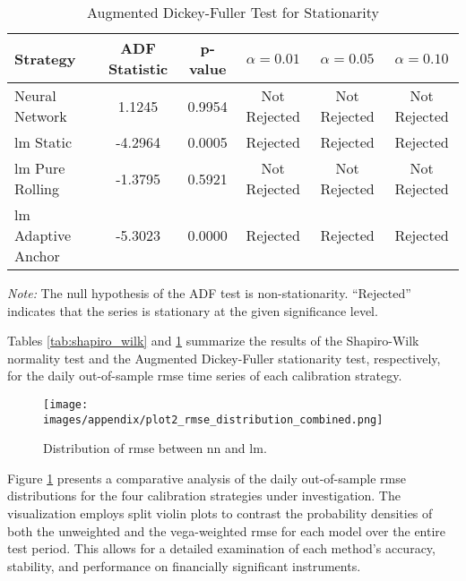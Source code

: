 \begin{table}[H]
	\centering
	\begin{threeparttable}
		\caption{Augmented Dickey-Fuller Test for Stationarity}
		\label{tab:adf_test}
		\begin{tabular}{lccccc}
			\toprule
			Strategy           & ADF Statistic & p-value & $\alpha=0.01$ & $\alpha=0.05$ & $\alpha=0.10$ \\
			\midrule
			Neural Network     & 1.1245        & 0.9954  & Not Rejected  & Not Rejected  & Not Rejected  \\
			\ac{lm} Static          & -4.2964       & 0.0005  & Rejected      & Rejected      & Rejected      \\
			\ac{lm} Pure Rolling    & -1.3795       & 0.5921  & Not Rejected  & Not Rejected  & Not Rejected  \\
			\ac{lm} Adaptive Anchor & -5.3023       & 0.0000  & Rejected      & Rejected      & Rejected      \\
			\bottomrule
		\end{tabular}
		\begin{tablenotes}
			\footnotesize
			\item \textit{Note:} The null hypothesis of the ADF test is non-stationarity. “Rejected” indicates that the series is stationary at the given significance level.
		\end{tablenotes}
	\end{threeparttable}
\end{table}
Tables \ref{tab:shapiro_wilk} and \ref{tab:adf_test} summarize the results of the Shapiro-Wilk normality test and the Augmented Dickey-Fuller stationarity test, respectively, for the daily out-of-sample \ac{rmse} time series of each calibration strategy.

\begin{figure}[H]
	\centering
	\texttt{[image: images/appendix/plot2\_rmse\_distribution\_combined.png]}
	\caption{Distribution of \ac{rmse} between \ac{nn} and \ac{lm}.}
	\label{fig:distribution_rmse_violin}
\end{figure}
 Figure \ref{fig:distribution_rmse_violin} presents a comparative analysis of the daily out-of-sample \ac{rmse} distributions for the four calibration strategies under investigation. The visualization employs split violin plots to contrast the probability densities of both the unweighted and the vega-weighted \ac{rmse} for each model over the entire test period. This allows for a detailed examination of each method's accuracy, stability, and performance on financially significant instruments.

